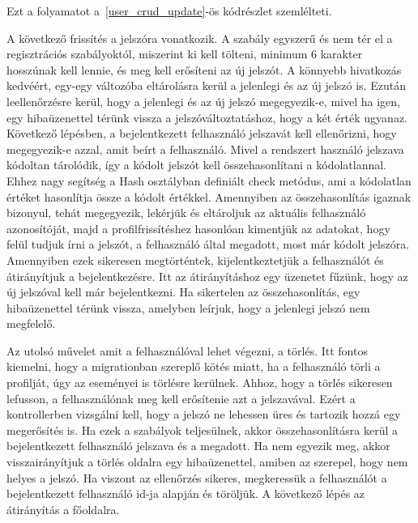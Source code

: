 \documentclass[
]{thesis-ekf}
\theoremstyle{definition}
\theoremstyle{remark}
\begin{document}
	Ezt a folyamatot a~\ref{user_crud_update}-ös kódrészlet szemlélteti.
	
	
	
	A következő frissítés a jelszóra vonatkozik. A szabály egyszerű és nem tér el a regisztrációs szabályoktól, miszerint ki kell tölteni, minimum 6 karakter hosszúnak kell lennie, és meg kell erősíteni az új jelszót. A könnyebb hivatkozás kedvéért, egy-egy változóba eltárolásra kerül a jelenlegi és az új jelszó is. Ezután leellenőrzésre kerül, hogy a jelenlegi és az új jelszó megegyezik-e, mivel ha igen, egy hibaüzenettel térünk vissza a jelszóváltoztatáshoz, hogy a két érték ugyanaz. Következő lépésben, a bejelentkezett felhasználó jelszavát kell ellenőrizni, hogy megegyezik-e azzal, amit beírt a felhasználó. Mivel a rendszert használó jelszava kódoltan tárolódik, így a kódolt jelszót kell összehasonlítani a kódolatlannal. Ehhez nagy segítség a Hash osztályban definiált check metódus, ami a kódolatlan értéket hasonlítja össze a kódolt értékkel. Amennyiben az összehasonlítás igaznak bizonyul, tehát megegyezik, lekérjük és eltároljuk az aktuális felhasználó azonosítóját, majd a profilfrissítéshez hasonlóan kimentjük az adatokat, hogy felül tudjuk írni a jelszót, a felhasználó által megadott, most már kódolt jelszóra. Amennyiben ezek sikeresen megtörténtek, kijelentkeztetjük a felhasználót és átirányítjuk a bejelentkezésre. Itt az átirányításhoz egy üzenetet fűzünk, hogy az új jelszóval kell már bejelentkezni. Ha sikertelen az összehasonlítás, egy hibaüzenettel térünk vissza, amelyben leírjuk, hogy a jelenlegi jelszó nem megfelelő. 
	
	Az utolsó művelet amit a felhasználóval lehet végezni, a törlés. Itt fontos kiemelni, hogy a migrationban szereplő kötés miatt, ha a felhasználó törli a profilját, úgy az eseményei is törlésre kerülnek. Ahhoz, hogy a törlés sikeresen lefusson, a felhasználónak meg kell erősítenie azt a jelszavával. Ezért a kontrollerben vizsgálni kell, hogy a jelszó ne lehessen üres és tartozik hozzá egy megerősítés is. Ha ezek a szabályok teljesülnek, akkor összehasonlításra kerül a bejelentkezett felhasználó jelszava és a megadott. Ha nem egyezik meg, akkor visszairányítjuk a törlés oldalra egy hibaüzenettel, amiben az szerepel, hogy nem helyes a jelszó. Ha viszont az ellenőrzés sikeres, megkeressük a felhasználót a bejelentkezett felhasználó id-ja alapján és töröljük. A következő lépés az átirányítás a főoldalra.
	
\end{document}
